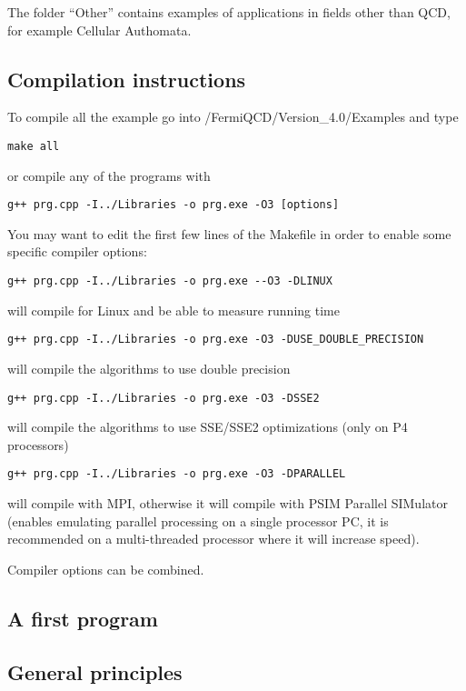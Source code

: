 The folder ``Other'' contains examples of applications in fields other than
QCD, for example Cellular Authomata.

\subsection{Compilation instructions}

To compile all the example go into /FermiQCD/Version\_4.0/Examples and type
\begin{verbatim}
make all
\end{verbatim}

or compile any of the programs with
\begin{verbatim}
g++ prg.cpp -I../Libraries -o prg.exe -O3 [options]
\end{verbatim}

You may want to edit the first few lines of the Makefile in order to enable
some specific compiler options:
\begin{verbatim}
g++ prg.cpp -I../Libraries -o prg.exe --O3 -DLINUX
\end{verbatim}

will compile for Linux and be able to measure running time
\begin{verbatim}
g++ prg.cpp -I../Libraries -o prg.exe -O3 -DUSE_DOUBLE_PRECISION
\end{verbatim}

will compile the algorithms to use double precision
\begin{verbatim}
g++ prg.cpp -I../Libraries -o prg.exe -O3 -DSSE2
\end{verbatim}

will compile the algorithms to use SSE/SSE2 optimizations (only on P4
processors)
\begin{verbatim}
g++ prg.cpp -I../Libraries -o prg.exe -O3 -DPARALLEL
\end{verbatim}

will compile with MPI, otherwise it will compile with PSIM Parallel
SIMulator (enables emulating parallel processing on a single processor PC,
it is recommended on a multi-threaded processor where it will increase
speed).

Compiler options can be combined.

\subsection{A first program}

\subsection{General principles}

